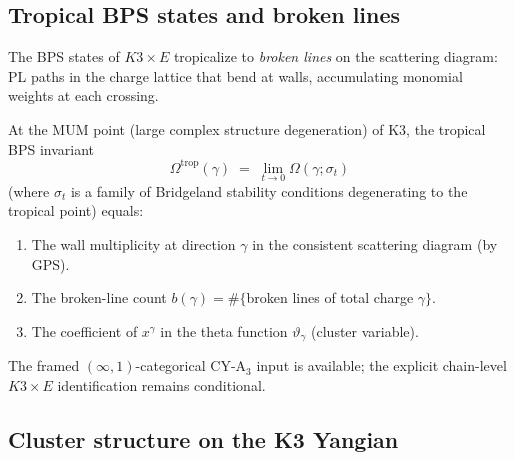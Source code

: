 \subsection{Tropical BPS states and broken lines}
\label{subsec:tropical-bps}

The BPS states of $K3 \times E$ tropicalize to \emph{broken lines} on the scattering diagram: PL paths in the charge lattice that bend at walls, accumulating monomial weights at each crossing.

\begin{conjecture}
\label{conj:tropical-bps}
\ClaimStatusConjectured
At the MUM point \textup{(}large complex structure degeneration\textup{)} of K3, the tropical BPS invariant
\[
 \Omega^{\mathrm{trop}}(\gamma) \;=\; \lim_{t \to 0} \Omega(\gamma; \sigma_t)
\]
\textup{(}where $\sigma_t$ is a family of Bridgeland stability conditions degenerating to the tropical point\textup{)} equals:
\begin{enumerate}[label=\textup{(\roman*)}]
\item The wall multiplicity at direction $\gamma$ in the consistent scattering diagram \textup{(}by GPS\textup{)}.
\item The broken-line count $b(\gamma) = \#\{$broken lines of total charge $\gamma\}$.
\item The coefficient of $x^\gamma$ in the theta function $\vartheta_\gamma$ \textup{(}cluster variable\textup{)}.
\end{enumerate}
The framed \((\infty,1)\)-categorical CY-A$_3$ input is available; the
explicit chain-level \(K3\times E\) identification remains conditional.
\end{conjecture}

\subsection{Cluster structure on the K3 Yangian}
\label{subsec:tropical-yangian-cluster}

